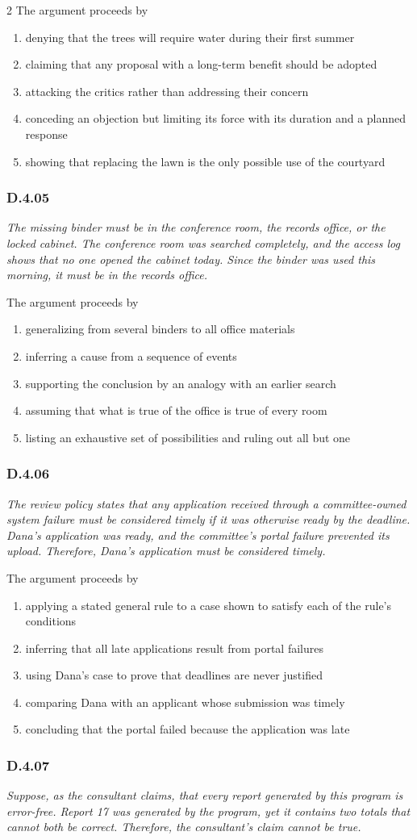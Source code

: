 \documentclass[10pt]{extarticle}
\newcommand{\choice}[1]{\item #1}
\newcommand{\bankitem}[1]{\subsubsection*{#1}}
\begin{document}
\begin{multicols}{2}
The argument proceeds by
\begin{enumerate}[label=(\alph*)]
  \choice{denying that the trees will require water during their first summer}
  \choice{claiming that any proposal with a long-term benefit should be adopted}
  \choice{attacking the critics rather than addressing their concern}
  \choice{conceding an objection but limiting its force with its duration and a planned response}
  \choice{showing that replacing the lawn is the only possible use of the courtyard}
\end{enumerate}
\bankitem{D.4.05}
\emph{The missing binder must be in the conference room, the records office, or the locked cabinet. The conference room was searched completely, and the access log shows that no one opened the cabinet today. Since the binder was used this morning, it must be in the records office.}

The argument proceeds by
\begin{enumerate}[label=(\alph*)]
  \choice{generalizing from several binders to all office materials}
  \choice{inferring a cause from a sequence of events}
  \choice{supporting the conclusion by an analogy with an earlier search}
  \choice{assuming that what is true of the office is true of every room}
  \choice{listing an exhaustive set of possibilities and ruling out all but one}
\end{enumerate}
\bankitem{D.4.06}
\emph{The review policy states that any application received through a committee-owned system failure must be considered timely if it was otherwise ready by the deadline. Dana's application was ready, and the committee's portal failure prevented its upload. Therefore, Dana's application must be considered timely.}

The argument proceeds by
\begin{enumerate}[label=(\alph*)]
  \choice{applying a stated general rule to a case shown to satisfy each of the rule's conditions}
  \choice{inferring that all late applications result from portal failures}
  \choice{using Dana's case to prove that deadlines are never justified}
  \choice{comparing Dana with an applicant whose submission was timely}
  \choice{concluding that the portal failed because the application was late}
\end{enumerate}
\bankitem{D.4.07}
\emph{Suppose, as the consultant claims, that every report generated by this program is error-free. Report 17 was generated by the program, yet it contains two totals that cannot both be correct. Therefore, the consultant's claim cannot be true.}


\end{multicols}
\end{document}

